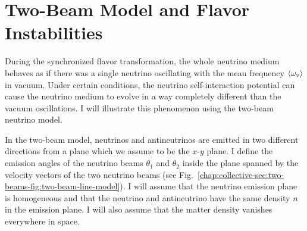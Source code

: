 






\section{\label{chap:collective-sec:two-beams}Two-Beam Model and Flavor Instabilities}

During the synchronized flavor transformation, the whole neutrino medium behaves as if there was a single neutrino oscillating with the mean frequency $\langle \omega_\mathrm v \rangle$ in vacuum. Under certain conditions, the neutrino self-interaction potential can cause the neutrino medium to evolve in a way completely different than the vacuum oscillations. I will illustrate this phenomenon using the two-beam neutrino model.

In the two-beam model, neutrinos and antineutrinos are emitted in two different directions from a plane which we assume to be the $x$-$y$ plane. I define the emission angles of the neutrino beams $\theta_1$ and $\theta_2$ inside the plane spanned by the velocity vectors of the two neutrino beams (see Fig.~\ref{chap:collective-sec:two-beams-fig:two-beam-line-model}). I will assume that the neutrino emission plane is homogeneous and that the neutrino and antineutrino have the same density $n$ in the emission plane. I will also assume that the matter density vanishes everywhere in space.



